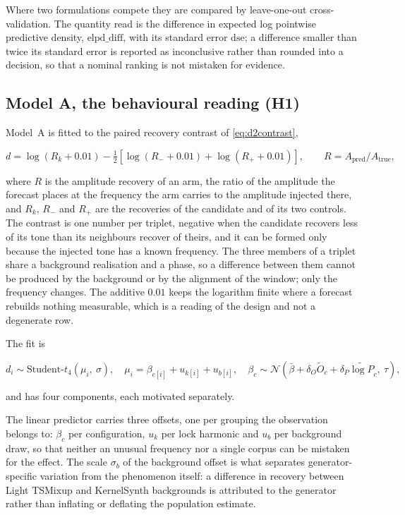 Where two formulations compete they are compared by leave-one-out cross-validation. The quantity read is the difference in expected log pointwise predictive density, $\mathrm{elpd\_diff}$, with its standard error $\mathrm{dse}$; a difference smaller than twice its standard error is reported as inconclusive rather than rounded into a decision, so that a nominal ranking is not mistaken for evidence.

\subsection{Model A, the behavioural reading (H1)}

Model~A is fitted to the paired recovery contrast of \autoref{eq:d2contrast},

\begin{equation}
\label{eq:appA:contrast}
d = \log(R_k + 0.01) - \tfrac{1}{2}\left[\log(R_- + 0.01) + \log(R_+ + 0.01)\right],
\qquad
R = A_{\mathrm{pred}}/A_{\mathrm{true}},
\end{equation}

where $R$ is the amplitude recovery of an arm, the ratio of the amplitude the forecast places at the frequency the arm carries to the amplitude injected there, and $R_k$, $R_-$ and $R_+$ are the recoveries of the candidate and of its two controls. The contrast is one number per triplet, negative when the candidate recovers less of its tone than its neighbours recover of theirs, and it can be formed only because the injected tone has a known frequency. The three members of a triplet share a background realisation and a phase, so a difference between them cannot be produced by the background or by the alignment of the window; only the frequency changes. The additive $0.01$ keeps the logarithm finite where a forecast rebuilds nothing measurable, which is a reading of the design and not a degenerate row.

The fit is

\begin{equation}
\label{eq:appA:model}
d_i \sim \text{Student-}t_4(\mu_i,\ \sigma),
\quad
\mu_i = \beta_{c[i]} + u_{k[i]} + u_{b[i]},
\quad
\beta_c \sim \mathcal{N}\!\left(\bar\beta + \delta_O \widetilde O_c + \delta_P \widetilde{\log P}_c,\ \tau\right),
\end{equation}

and has four components, each motivated separately.

The linear predictor carries three offsets, one per grouping the observation belongs to: $\beta_c$ per configuration, $u_k$ per lock harmonic and $u_b$ per background draw, so that neither an unusual frequency nor a single corpus can be mistaken for the effect. The scale $\sigma_b$ of the background offset is what separates generator-specific variation from the phenomenon itself: a difference in recovery between Light TSMixup and KernelSynth backgrounds is attributed to the generator rather than inflating or deflating the population estimate.

